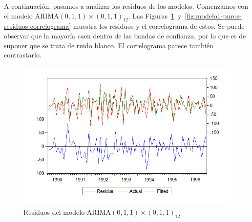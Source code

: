 \documentclass[12pt,a4paper,twoside,openright,titlepage,final]{article}
\begin{document}
A continuación, pasamos a analizar los residuos de los modelos. Comenzamos con el modelo ARIMA$(0,1,1)\times(0,1,1)_{12}$. Las Figuras~\ref{fig:modelo1-puros-residuos}~y~\ref{fig:modelo1-puros-residuos-correlograma} muestra los residuos y el correlograma de estos. Se puede observar que la mayoría caen dentro de las bandas de confianza, por lo que es de suponer que se trata de ruido blanco. El correlograma parece también contrastarlo.\\

\begin{figure}[tbph!]
	\centering
	\includegraphics[width=0.8\linewidth]{imagenes/puros/modelo1-residuos.png}
	\caption{Residuos del modelo ARIMA$(0,1,1)\times(0,1,1)_{12}$}
	\label{fig:modelo1-puros-residuos}
\end{figure}
\end{document}
